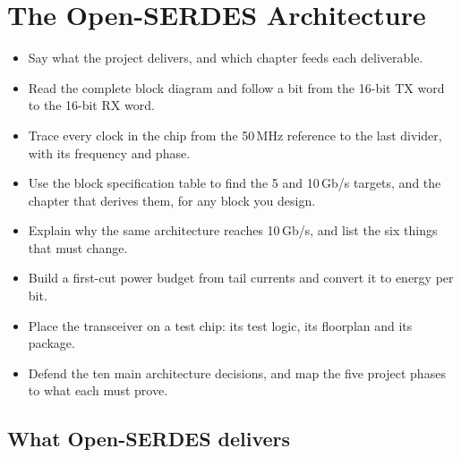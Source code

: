 \setcounter{topnumber}{3}\setcounter{bottomnumber}{2}\setcounter{totalnumber}{5}
\renewcommand{\topfraction}{0.9}\renewcommand{\bottomfraction}{0.6}
\renewcommand{\textfraction}{0.08}\renewcommand{\floatpagefraction}{0.8}

\chapter{The Open-SERDES Architecture}\label{ch:arch}


\begin{objectives}
\begin{itemize}
  \item Say what the project delivers, and which chapter feeds each deliverable.
  \item Read the complete \OS{} block diagram and follow a bit from the 16-bit TX word to the 16-bit RX word.
  \item Trace every clock in the chip from the 50\,MHz reference to the last divider, with its frequency and phase.
  \item Use the block specification table to find the 5 and 10\,Gb/s targets, and the chapter that derives them, for any block you design.
  \item Explain why the same architecture reaches 10\,Gb/s, and list the six things that must change.
  \item Build a first-cut power budget from tail currents and convert it to energy per bit.
  \item Place the transceiver on a test chip: its test logic, its floorplan and its package.
  \item Defend the ten main architecture decisions, and map the five project phases to what each must prove.
\end{itemize}
\end{objectives}

\section{What Open-SERDES delivers}\label{sec:ch14-deliver}

